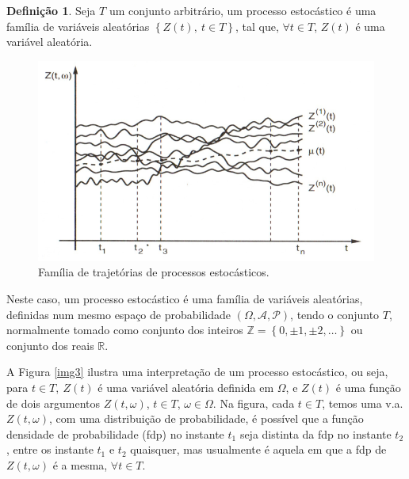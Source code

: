\documentclass[
	12pt,				%
	openright,			%
	oneside,      %
	a4paper,			%
	english,			%
	french,				%
	spanish,			%
	brazil,				%
	]{abntex2}\usepackage[]{graphicx}\usepackage[table]{xcolor}
\theoremstyle{definition}
\newtheorem{definition}{Definição}[section]
\theoremstyle{remark}
\begin{document}
\begin{definition}

Seja $T$ um conjunto arbitrário, um processo estocástico é uma família de variáveis aleatórias 
$\left\{Z(t),\ t \in T \right\}$, tal que, $\forall t \in T$,  $Z(t)$ é uma variável aleatória.

\end{definition}
  
\begin{figure}
  \caption{\label{img4}Família de trajetórias de processos estocásticos.}
    \begin{center}
      \includegraphics[scale = 0.9]{image/img4.png}
    \end{center}
\end{figure}

Neste caso, um processo estocástico é uma família de variáveis aleatórias, definidas num mesmo espaço de probabilidade $(\Omega, \mathcal{A}, \mathcal{P})$, tendo o conjunto $T$, normalmente tomado como conjunto dos inteiros $\mathbb{Z} = \left\{0,\pm 1, \pm 2, \ldots \right\}$ ou conjunto dos reais $\mathbb{R}$.

A Figura \ref{img3} ilustra uma interpretação de um processo estocástico, ou seja, para $t \in T,\ Z(t)$ é uma variável aleatória definida em $\Omega$, e $Z(t)$ é uma função de dois argumentos $Z(t, \omega)$, $t \in T$, $\omega \in \Omega$. Na figura, cada $t \in T$, temos uma v.a. $Z(t, \omega)$, com uma distribuição de probabilidade, é possível que a função densidade de probabilidade (fdp) no instante $t_1$ seja distinta da fdp no instante $t_2$, entre os instante $t_1$ e $t_2$ quaisquer, mas usualmente é aquela em que a fdp de $Z(t, \omega)$ é a mesma, $\forall t \in T$.
\end{document}
